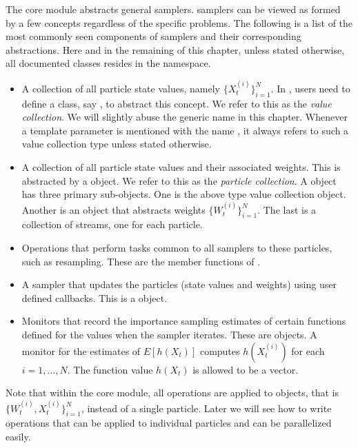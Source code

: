 The core module abstracts general \smc samplers. \smc samplers can be viewed
as formed by a few concepts regardless of the specific problems. The following
is a list of the most commonly seen components of \smc samplers and their
corresponding \vsmc abstractions. Here and in the remaining of this chapter,
unless stated otherwise, all documented classes resides in the
 namespace.
\begin{itemize}
  \item A collection of all particle state values, namely
    $\{X_t^{(i)}\}_{i=1}^N$. In \vsmc, users need to define a class, say
    , to abstract this concept. We refer to this as the
    \emph{value collection}. We will slightly abuse the generic name
     in this chapter. Whenever a template parameter is mentioned
    with the name , it always refers to such a value collection
    type unless stated otherwise.
  \item A collection of all particle state values and their associated
    weights. This is abstracted by a  object. We refer
    to this as the \emph{particle collection}. A 
    object has three primary sub-objects. One is the above type 
    value collection object. Another is an object that abstracts weights
    $\{W_t^{(i)}\}_{i=1}^N$. The last is a collection of \rng streams, one for
    each particle.
  \item Operations that perform tasks common to all samplers to these
    particles, such as resampling. These are the member functions of
    .
  \item A sampler that updates the particles (state values and weights) using
    user defined callbacks. This is a  object.
  \item Monitors that record the importance sampling estimates of certain
    functions defined for the values when the sampler iterates. These are
     objects. A monitor for the estimates of $E[h(X_t)]$
    computes $h(X_t^{(i)})$ for each $i = 1,\dots,N$. The function value
    $h(X_t)$ is allowed to be a vector.
\end{itemize}
Note that within the core module, all operations are applied to
 objects, that is $\{W_t^{(i)},X_t^{(i)}\}_{i=1}^N$,
instead of a single particle. Later we will see how to write operations that
can be applied to individual particles and can be parallelized easily.

